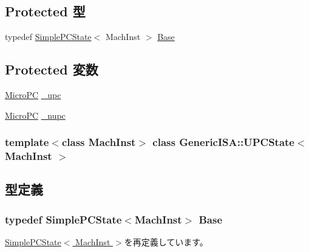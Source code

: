 \subsection*{Protected 型}
\begin{DoxyCompactItemize}
\item 
typedef \hyperlink{classGenericISA_1_1SimplePCState}{SimplePCState}$<$ MachInst $>$ \hyperlink{classGenericISA_1_1UPCState_a6d61e15302422cb743d88ee2ca4fd482}{Base}
\end{DoxyCompactItemize}
\subsection*{Protected 変数}
\begin{DoxyCompactItemize}
\item 
\hyperlink{base_2types_8hh_adfb4d8b20c5abc8be73dd367b16f2d57}{MicroPC} \hyperlink{classGenericISA_1_1UPCState_ada1172c4155a1a9d7c37c92ca5326ba7}{\_\-upc}
\item 
\hyperlink{base_2types_8hh_adfb4d8b20c5abc8be73dd367b16f2d57}{MicroPC} \hyperlink{classGenericISA_1_1UPCState_ac04fdfa88334f532e3358ae2d9cff2cd}{\_\-nupc}
\end{DoxyCompactItemize}
\subsubsection*{template$<$class MachInst$>$ class GenericISA::UPCState$<$ MachInst $>$}



\subsection{型定義}
\hypertarget{classGenericISA_1_1UPCState_a6d61e15302422cb743d88ee2ca4fd482}{
\subsubsection[{Base}]{\setlength{\rightskip}{0pt plus 5cm}typedef {\bf SimplePCState}$<$MachInst$>$ {\bf Base}}}
\label{classGenericISA_1_1UPCState_a6d61e15302422cb743d88ee2ca4fd482}


\hyperlink{classGenericISA_1_1SimplePCState_aa75666a3abd25e3bd389680193c6e8e6}{SimplePCState$<$ MachInst $>$}を再定義しています。


